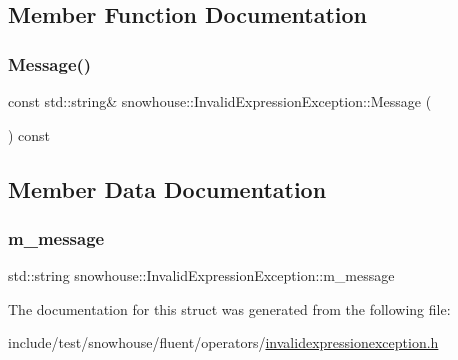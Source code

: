 \subsection{Member Function Documentation}
\mbox{\label{structsnowhouse_1_1InvalidExpressionException_a70e392435e5c189d9bf1fd130abec75b}} 
\subsubsection{\texorpdfstring{Message()}{Message()}}
{\footnotesize\ttfamily const std\+::string\& snowhouse\+::\+Invalid\+Expression\+Exception\+::\+Message (\begin{DoxyParamCaption}{ }\end{DoxyParamCaption}) const\hspace{0.3cm}{\ttfamily [inline]}}



\subsection{Member Data Documentation}
\mbox{\label{structsnowhouse_1_1InvalidExpressionException_a21b5f91ff631cb83fbd492f8604d8013}} 
\subsubsection{\texorpdfstring{m\_message}{m\_message}}
{\footnotesize\ttfamily std\+::string snowhouse\+::\+Invalid\+Expression\+Exception\+::m\+\_\+message}



The documentation for this struct was generated from the following file\+:\begin{DoxyCompactItemize}
\item 
include/test/snowhouse/fluent/operators/\mbox{\hyperlink{invalidexpressionexception_8h}{invalidexpressionexception.\+h}}\end{DoxyCompactItemize}
